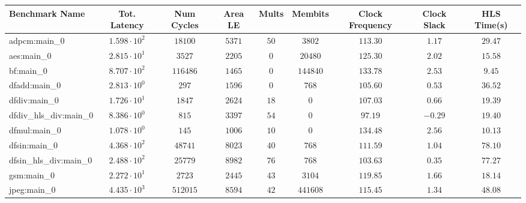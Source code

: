 \begin{tabular}{|l|c|c|c|c|c|c|c|c|}
\hline
Benchmark Name          & Tot. Latency           & Num Cycles & Area LE   & Mults   & Membits    & Clock Frequency & Clock Slack & HLS Time(s) \\
\hline
adpcm:main\_0           & $ 1.598 \cdot 10^{2} $ & $ 18100  $ & $ 5371  $ & $ 50  $ & $ 3802   $ & $ 113.30      $ & $ 1.17    $ & $ 29.47   $ \\
aes:main\_0             & $ 2.815 \cdot 10^{1} $ & $ 3527   $ & $ 2205  $ & $ 0   $ & $ 20480  $ & $ 125.30      $ & $ 2.02    $ & $ 15.58   $ \\
bf:main\_0              & $ 8.707 \cdot 10^{2} $ & $ 116486 $ & $ 1465  $ & $ 0   $ & $ 144840 $ & $ 133.78      $ & $ 2.53    $ & $ 9.45    $ \\
dfadd:main\_0           & $ 2.813 \cdot 10^{0} $ & $ 297    $ & $ 1596  $ & $ 0   $ & $ 768    $ & $ 105.60      $ & $ 0.53    $ & $ 36.52   $ \\
dfdiv:main\_0           & $ 1.726 \cdot 10^{1} $ & $ 1847   $ & $ 2624  $ & $ 18  $ & $ 0      $ & $ 107.03      $ & $ 0.66    $ & $ 19.39   $ \\
dfdiv\_hls\_div:main\_0 & $ 8.386 \cdot 10^{0} $ & $ 815    $ & $ 3397  $ & $ 54  $ & $ 0      $ & $ 97.19       $ & $ -0.29   $ & $ 19.40   $ \\
dfmul:main\_0           & $ 1.078 \cdot 10^{0} $ & $ 145    $ & $ 1006  $ & $ 10  $ & $ 0      $ & $ 134.48      $ & $ 2.56    $ & $ 10.13   $ \\
dfsin:main\_0           & $ 4.368 \cdot 10^{2} $ & $ 48741  $ & $ 8023  $ & $ 40  $ & $ 768    $ & $ 111.59      $ & $ 1.04    $ & $ 78.10   $ \\
dfsin\_hls\_div:main\_0 & $ 2.488 \cdot 10^{2} $ & $ 25779  $ & $ 8982  $ & $ 76  $ & $ 768    $ & $ 103.63      $ & $ 0.35    $ & $ 77.27   $ \\
gsm:main\_0             & $ 2.272 \cdot 10^{1} $ & $ 2723   $ & $ 2445  $ & $ 43  $ & $ 3104   $ & $ 119.85      $ & $ 1.66    $ & $ 18.14   $ \\
jpeg:main\_0            & $ 4.435 \cdot 10^{3} $ & $ 512015 $ & $ 8594  $ & $ 42  $ & $ 441608 $ & $ 115.45      $ & $ 1.34    $ & $ 48.08   $ \\

\end{tabular}
